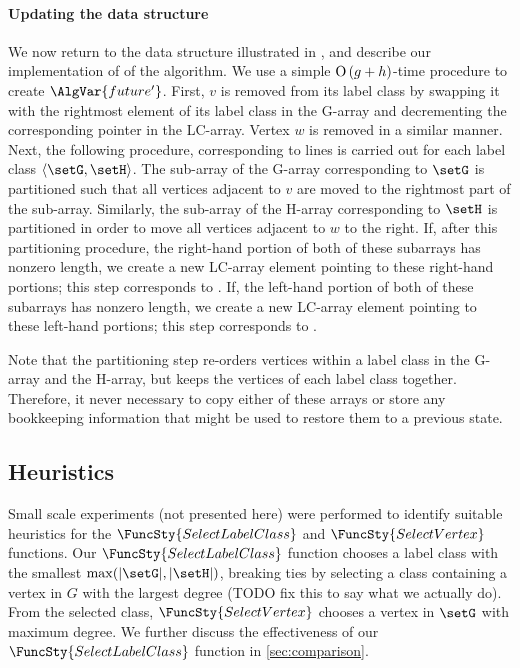 \paragraph{Updating the data structure}
We now return to the data structure illustrated in , and describe
our implementation of  of the algorithm.
We use a simple $\operatorname{O}\left(g+h\right)$-time procedure to create $\AlgVar{future'}$.
First, $v$ is removed from its label class by swapping it with the rightmost
element of its label class in the G-array and decrementing the corresponding
pointer in the LC-array. Vertex $w$ is removed in a similar manner.
Next, the following procedure, corresponding to lines 
is carried out for each label class $\langle \setG,\setH \rangle$.  The sub-array
of the G-array corresponding to $\setG$ is partitioned such that all vertices adjacent to $v$ are moved to
the rightmost part of the sub-array. Similarly, the sub-array of the H-array corresponding to $\setH$
is partitioned in order to move all vertices adjacent to $w$ to the right.
If, after this partitioning procedure, the right-hand portion of both of these subarrays
has nonzero length, we create a new LC-array element pointing to these right-hand portions;
this step corresponds to .
If, the left-hand portion of both of these subarrays
has nonzero length, we create a new LC-array element pointing to these left-hand portions;
this step corresponds to .

Note that the partitioning step re-orders vertices within a label class in the G-array and
the H-array, but keeps the vertices of each label class together. Therefore, it never necessary
to copy either of these arrays or store any bookkeeping information that might be used to
restore them to a previous state.

\subsection{Heuristics}

Small scale experiments (not presented here) were performed to identify
suitable heuristics for the $\FuncSty{SelectLabelClass}$ and
$\FuncSty{SelectVertex}$ functions.  Our $\FuncSty{SelectLabelClass}$
function chooses a label class with the smallest $\max(|\setG|,|\setH|)$,
breaking ties by selecting a class containing a vertex in $G$ with the largest degree (TODO fix this to say what we actually do). From
the selected class, $\FuncSty{SelectVertex}$ chooses a vertex in $\setG$ with
maximum degree. We further discuss the effectiveness of our
$\FuncSty{SelectLabelClass}$ function in \cref{sec:comparison}.

